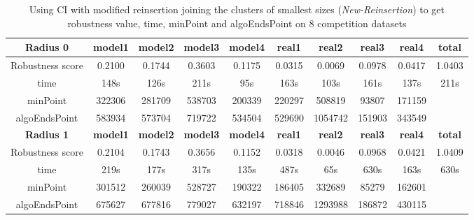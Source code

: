 \documentclass{article}
\begin{document}
	 
	\begin{table}[!htbp]
	\begin{adjustwidth}{-1cm}{}		
		\begin{threeparttable}		
			\centering
			\caption{Using CI with modified reinsertion joining the clusters of smallest sizes (\textit{New-Reinsertion}) to get robustness value, time, minPoint and algoEndsPoint  on 8 competition datasets}
			\label{tab:table12}
			\begin{tabular}{|c|c|c|c|c|c|c|c|c|c|}
				\hline
				\textbf{Radius 0} & \textbf{model1} & \textbf{model2} & \textbf{model3} & \textbf{model4} & \textbf{real1} & \textbf{real2} & \textbf{real3} & \textbf{real4} & \textbf{total} \\ \hline
				Robustness score                 & 0.2100    & 0.1744    & 0.3603    & 0.1175    & 0.0315    & 0.0069    & 0.0978    & 0.0417    & 1.0403    \\ \hline
				
				time                             & 148s      & 126s      & 211s      & 95s       & 163s      & 103s      & 161s      & 137s      & 211s      \\ \hline
				minPoint                & 322306          & 281709          & 538703          & 200339          & 220297         & 508819         & 93807          & 171159         &                \\ \hline
				algoEndsPoint           & 583934          & 573704          & 719722          & 534504          & 529690         & 1054742        & 151903         & 343549         &                \\ \hline
				
				\textbf{Radius 1} & \textbf{model1} & \textbf{model2} & \textbf{model3} & \textbf{model4} & \textbf{real1} & \textbf{real2} & \textbf{real3} & \textbf{real4} & \textbf{total} \\ \hline
				Robustness score                 & 0.2104    & 0.1743    & 0.3656    & 0.1152    & 0.0318    & 0.0046    & 0.0968    & 0.0421    & 1.0409    \\ \hline
				
				time                             & 219s      & 177s      & 317s      & 135s      & 487s      & 65s       & 630s      & 163s      & 630s      \\ \hline
				
				minPoint                         & 301512          & 260039          & 528727          & 190322          & 186405         & 332689         & 85279          & 162601         &                \\ \hline
				algoEndsPoint                    & 675627          & 677816          & 779027          & 632197          & 718846         & 1293988        & 186872         & 430115         &                \\ \hline		
				

\end{tabular}
\end{threeparttable}
\end{adjustwidth}
\end{table}
\end{document}
